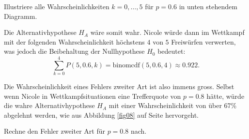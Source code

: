 \documentclass[%
11pt,%
twoside,%
titlepage,%
german,%
headsepline%
]{scrartcl}
\begin{document}
\begin{ueb}
Illustriere alle Wahrscheinlichkeiten $k=0,\dots,5$ für $p=0.6$ in unten stehendem Diagramm.
\end{ueb}

\begin{center}
\end{center}

Die Alternativhypothese $H_A$ wäre somit wahr. Nicole würde dann im Wettkampf mit der folgenden Wahrscheinlichkeit höchstens $4$ von $5$ Freiwürfen verwerten, was jedoch die Beibehaltung der Nullhypothese $H_0$ bedeutet:
$$\sum_{k=0}^4P(5,0.6,k)=\text{binomcdf}(5,0.6,4)\approx0.922.$$

Die Wahrscheinlichkeit eines Fehlers zweiter Art ist also immens gross. Selbst wenn Nicole in Wettkampfsituationen eine Trefferquote von $p=0.8$ hätte, würde die wahre Alternativhypothese $H_A$ mit einer Wahrscheinlichkeit von über 67\% abgelehnt werden, wie aus Abbildung \ref{fig08} auf Seite \pageref{fig08} hervorgeht.

\begin{ueb}
Rechne den Fehler zweiter Art für $p=0.8$ nach.
\end{ueb}
\end{document}

